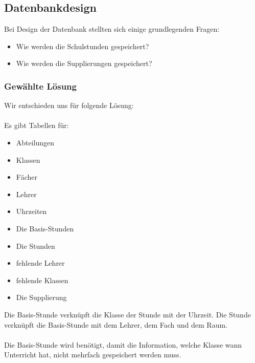 \subsection{Datenbankdesign}
Bei Design der Datenbank stellten sich einige grundlegenden Fragen:

\begin{itemize}
	\item Wie werden die Schulstunden gespeichert?
	\item Wie werden die Supplierungen gespeichert?
\end{itemize}

\subsubsection{Gewählte Lösung}
Wir entschieden uns für folgende Lösung:\\
\\
Es gibt Tabellen für:\\
\begin{itemize}
	\item Abteilungen
	\item Klassen
	\item Fächer
	\item Lehrer
	\item Uhrzeiten
\end{itemize}
\vspace{0.03cm}
\begin{itemize}
	\item Die Basis-Stunden
	\item Die Stunden
\end{itemize}
\vspace{0.03cm}
\begin{itemize}
	\item fehlende Lehrer
	\item fehlende Klassen
\end{itemize}
\vspace{0.03cm}
\begin{itemize}
	\item Die Supplierung
\end{itemize}
Die Basis-Stunde verknüpft die Klasse der Stunde mit der Uhrzeit. Die Stunde verknüpft die Basis-Stunde mit dem Lehrer, dem Fach und dem Raum.\\
\\
Die Basis-Stunde wird benötigt, damit die Information, welche Klasse wann Unterricht hat, nicht mehrfach gespeichert werden muss.\\
